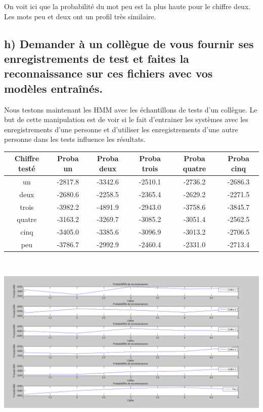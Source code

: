 On voit ici que la probabilité du mot peu est la plus haute pour le chiffre deux. Les mots peu et deux ont un profil très similaire.


\subsection{h) Demander à un collègue de vous fournir ses enregistrements de test et faites la reconnaissance sur ces fichiers avec vos modèles entraînés.}

Nous testons maintenant les HMM avec les échantillons de tests d'un collègue. Le but de cette manipulation est de voir si le fait d'entrainer les systèmes avec les enregistrements d'une personne et d'utiliser les enregistrements d'une autre personne dans les tests influence les résultats.
\\

\begin{tabular}{|c|c|c|c|c|c|}
\hline 
Chiffre testé & Proba un & Proba deux & Proba trois & Proba quatre & Proba cinq \\ 
\hline 
un & -2817.8 & -3342.6 & -2510.1 & -2736.2 & -2686.3 \\ 
\hline 
deux & -2680.6 & -2258.5 & -2365.4 & -2629.2 & -2271.5 \\ 
\hline 
trois & -3982.2 & -4891.9 & -2943.0 & -3758.6 & -3845.7 \\ 
\hline 
quatre & -3163.2 & -3269.7 & -3085.2 & -3051.4 & -2562.5 \\ 
\hline 
cinq & -3405.0 & -3385.6 & -3096.9 & -3013.2 & -2706.5 \\ 
\hline 
peu & -3786.7 & -2992.9 & -2460.4 & -2331.0 & -2713.4 \\ 
\hline 
\end{tabular} 
\\

\begin{center}
\includegraphics[width=17cm]{Ressources/Graphiques/ProbaReconnSepare_croise.png} 
\end{center}


